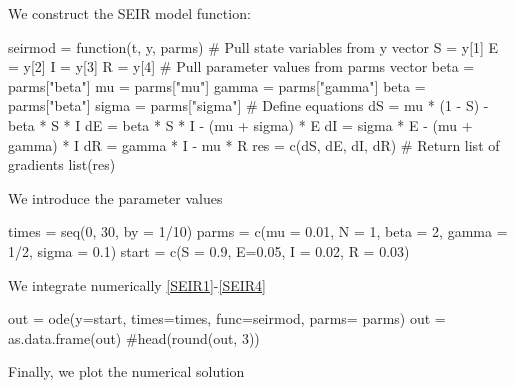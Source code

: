 \documentclass[12pt]{article}\usepackage[]{graphicx}\usepackage[]{color}
\begin{document}
We construct the SEIR model function:

\begin{Schunk}
\begin{Sinput}
seirmod = function(t, y, parms) {
  # Pull state variables from y vector
  S = y[1]
  E = y[2]
  I = y[3]
  R = y[4]
  # Pull parameter values from parms vector beta = parms["beta"]
  mu = parms["mu"]
  gamma = parms["gamma"]
  beta = parms["beta"]
  sigma = parms["sigma"]
  # Define equations
  dS = mu * (1 - S) - beta * S * I
  dE = beta * S * I - (mu + sigma) * E
  dI = sigma * E  - (mu + gamma) * I 
  dR = gamma * I - mu * R
  res = c(dS, dE, dI, dR)
  # Return list of gradients
  list(res)
}
\end{Sinput}
\end{Schunk}

We introduce the parameter values

\begin{Schunk}
\begin{Sinput}
times = seq(0, 30, by = 1/10)
parms = c(mu = 0.01, N = 1, beta = 2, gamma = 1/2, sigma = 0.1)
start = c(S = 0.9, E=0.05, I = 0.02, R = 0.03)
\end{Sinput}
\end{Schunk}


We integrate numerically \eqref{SEIR1}-\eqref{SEIR4}

\begin{Schunk}
\begin{Sinput}
out = ode(y=start, times=times, func=seirmod, parms= parms)
out = as.data.frame(out) 
#head(round(out, 3))
\end{Sinput}
\end{Schunk}

Finally, we plot the numerical solution
\end{document}
